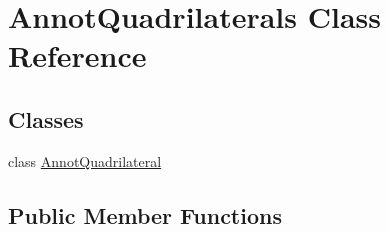 \hypertarget{class_annot_quadrilaterals}{}\section{Annot\+Quadrilaterals Class Reference}
\label{class_annot_quadrilaterals}
\subsection*{Classes}
\begin{DoxyCompactItemize}
\item 
class \hyperlink{class_annot_quadrilaterals_1_1_annot_quadrilateral}{Annot\+Quadrilateral}
\end{DoxyCompactItemize}
\subsection*{Public Member Functions}

